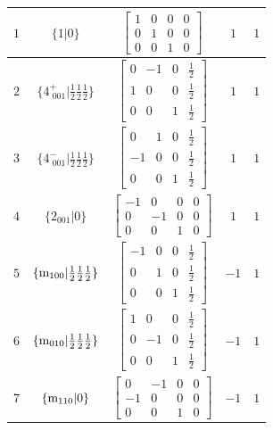 \documentclass[fleqn,8pt]{jsarticle}
\begin{document}
\begin{longtable}{ccccc}
$ 1 $ & $ \{1|0\} $ & $ \begin{bmatrix} 1 & 0 & 0 & 0 \\ 0 & 1 & 0 & 0 \\ 0 & 0 & 1 & 0 \end{bmatrix} $ & $ 1 $ & $ 1 $ \\ \hline
$ 2 $ & $ \{4^{+}_{\,\,001}|\frac{1}{2} \frac{1}{2} \frac{1}{2}\} $ & $ \begin{bmatrix} 0 & -1 & 0 & \frac{1}{2} \\ 1 & 0 & 0 & \frac{1}{2} \\ 0 & 0 & 1 & \frac{1}{2} \end{bmatrix} $ & $ 1 $ & $ 1 $ \\ \hline
$ 3 $ & $ \{4^{-}_{\,\,001}|\frac{1}{2} \frac{1}{2} \frac{1}{2}\} $ & $ \begin{bmatrix} 0 & 1 & 0 & \frac{1}{2} \\ -1 & 0 & 0 & \frac{1}{2} \\ 0 & 0 & 1 & \frac{1}{2} \end{bmatrix} $ & $ 1 $ & $ 1 $ \\ \hline
$ 4 $ & $ \{2{}_{001}|0\} $ & $ \begin{bmatrix} -1 & 0 & 0 & 0 \\ 0 & -1 & 0 & 0 \\ 0 & 0 & 1 & 0 \end{bmatrix} $ & $ 1 $ & $ 1 $ \\ \hline
$ 5 $ & $ \{{\rm m}_{100}|\frac{1}{2} \frac{1}{2} \frac{1}{2}\} $ & $ \begin{bmatrix} -1 & 0 & 0 & \frac{1}{2} \\ 0 & 1 & 0 & \frac{1}{2} \\ 0 & 0 & 1 & \frac{1}{2} \end{bmatrix} $ & $ -1 $ & $ 1 $ \\ \hline
$ 6 $ & $ \{{\rm m}_{010}|\frac{1}{2} \frac{1}{2} \frac{1}{2}\} $ & $ \begin{bmatrix} 1 & 0 & 0 & \frac{1}{2} \\ 0 & -1 & 0 & \frac{1}{2} \\ 0 & 0 & 1 & \frac{1}{2} \end{bmatrix} $ & $ -1 $ & $ 1 $ \\ \hline
$ 7 $ & $ \{{\rm m}_{110}|0\} $ & $ \begin{bmatrix} 0 & -1 & 0 & 0 \\ -1 & 0 & 0 & 0 \\ 0 & 0 & 1 & 0 \end{bmatrix} $ & $ -1 $ & $ 1 $ \\ \hline

\end{longtable}
\end{document}
